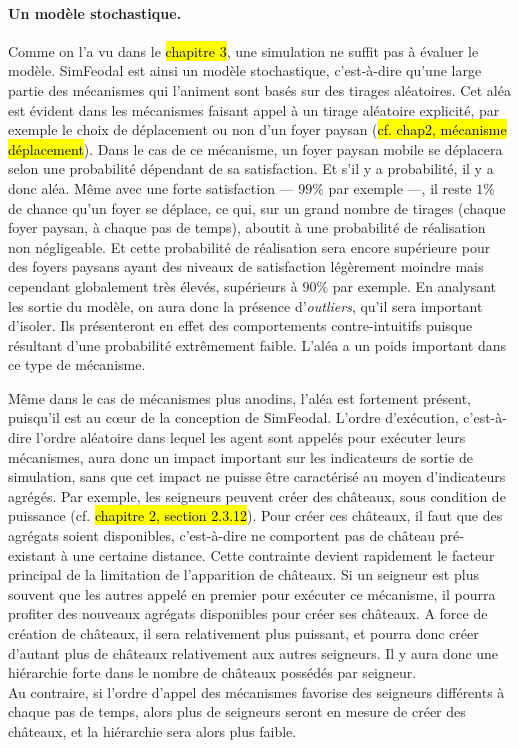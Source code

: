 \paragraph{Un modèle stochastique.}

Comme on l'a vu dans le \hl{chapitre 3}, une simulation ne suffit pas à évaluer le modèle.
SimFeodal est ainsi un modèle stochastique, c'est-à-dire qu'une large partie des mécanismes qui l'animent sont basés sur des tirages aléatoires.
Cet aléa est évident dans les mécanismes faisant appel à un tirage aléatoire explicité, par exemple le choix de déplacement ou non d'un foyer paysan (\hl{cf. chap2, mécanisme déplacement}).
Dans le cas de ce mécanisme, un foyer paysan mobile se déplacera selon une probabilité dépendant de sa satisfaction.
Et s'il y a probabilité, il y a donc aléa.
Même avec une forte satisfaction --- $99\%$ par exemple ---, il reste $1\%$ de chance qu'un foyer se déplace, ce qui, sur un grand nombre de tirages (chaque foyer paysan, à chaque pas de temps), aboutit à une probabilité de réalisation non négligeable.
Et cette probabilité de réalisation sera encore supérieure pour des foyers paysans ayant des niveaux de satisfaction légèrement moindre mais cependant globalement très élevés, supérieurs à $90\%$ par exemple.
En analysant les sortie du modèle, on aura donc la présence d'\textit{outliers}, qu'il sera important d'isoler.
Ils présenteront en effet des comportements contre-intuitifs puisque résultant d'une probabilité extrêmement faible.
L'aléa a un poids important dans ce type de mécanisme.

Même dans le cas de mécanismes plus anodins, l'aléa est fortement présent, puisqu'il est au cœur de la conception de SimFeodal.
L'ordre d'exécution, c'est-à-dire l'ordre aléatoire dans lequel les agent sont appelés pour exécuter leurs mécanismes, aura donc un impact important sur les indicateurs de sortie de simulation, sans que cet impact ne puisse être caractérisé au moyen d'indicateurs agrégés.
Par exemple, les seigneurs peuvent créer des châteaux, sous condition de puissance (cf. \hl{chapitre 2, section 2.3.12}).
Pour créer ces châteaux, il faut que des agrégats soient \og disponibles\fg{}, c'est-à-dire ne comportent pas de château pré-existant à une certaine distance. Cette contrainte devient rapidement le facteur principal de la limitation de l'apparition de châteaux.
Si un seigneur est plus souvent que les autres \og appelé\fg{} en premier pour exécuter ce mécanisme, il pourra profiter des nouveaux agrégats disponibles pour créer ses châteaux.
A force de création de châteaux, il sera relativement plus puissant, et pourra donc créer d'autant plus de châteaux relativement aux autres seigneurs.
Il y aura donc une hiérarchie forte dans le nombre de châteaux possédés par seigneur.\\
Au contraire, si l'ordre d'appel des mécanismes favorise des seigneurs différents à chaque pas de temps, alors plus de seigneurs seront en mesure de créer des châteaux, et la hiérarchie sera alors plus faible.

